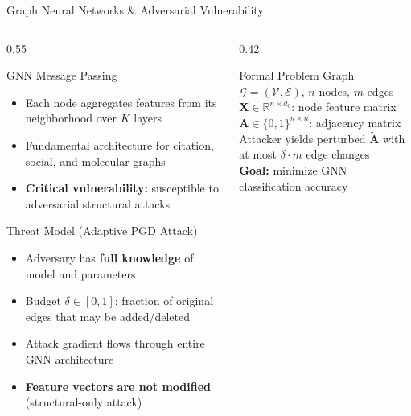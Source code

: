 \documentclass[aspectratio=169]{beamer}
\begin{document}
\begin{frame}{Graph Neural Networks \& Adversarial Vulnerability}
  \begin{columns}[T]
    \begin{column}{0.55\textwidth}
      \begin{block}{GNN Message Passing}
        \begin{itemize}
          \item Each node aggregates features from its neighborhood over $K$ layers
          \item Fundamental architecture for citation, social, and molecular graphs
          \item \textbf{Critical vulnerability:} susceptible to adversarial structural attacks
        \end{itemize}
      \end{block}
      \vspace{6pt}
      \begin{block}{Threat Model (Adaptive PGD Attack)}
        \begin{itemize}
          \item Adversary has \textbf{full knowledge} of model and parameters
          \item Budget $\delta \in [0,1]$: fraction of original edges that may be added/deleted
          \item Attack gradient flows through entire GNN architecture
          \item \textbf{Feature vectors are not modified} (structural-only attack)
        \end{itemize}
      \end{block}
    \end{column}
    \begin{column}{0.42\textwidth}
      \begin{alertblock}{Formal Problem}
        \small
        Graph $\mathcal{G} = (\mathcal{V}, \mathcal{E})$, $n$ nodes, $m$ edges\\[4pt]
        $\mathbf{X} \in \mathbb{R}^{n \times d_0}$: node feature matrix\\[4pt]
        $\mathbf{A} \in \{0,1\}^{n \times n}$: adjacency matrix\\[4pt]
        Attacker yields perturbed $\tilde{\mathbf{A}}$ with at most $\delta \cdot m$ edge changes\\[4pt]
        \textbf{Goal:} minimize GNN classification accuracy
      \end{alertblock}
    \end{column}
  \end{columns}
\end{frame}
\end{document}
